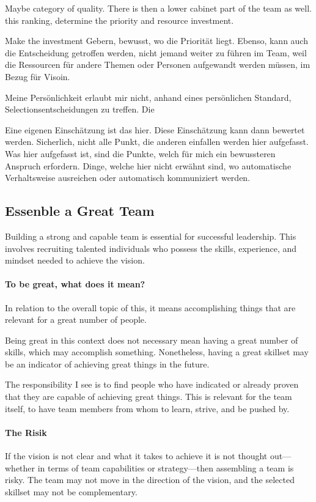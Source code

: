 Maybe category of quality.
There is then a lower cabinet part of the team as well. 
this ranking, determine the priority and resource investment.

Make the investment Gebern, bewusst, wo die Priorität liegt.
Ebenso, kann auch die Entscheidung getroffen werden, nicht jemand weiter zu führen im Team, weil die Ressourcen für andere Themen oder Personen aufgewandt werden müssen, im Bezug für Visoin.

Meine Persönlichkeit erlaubt mir nicht, anhand eines persönlichen Standard, Selectionsentscheidungen zu treffen.
Die 

Eine eigenen Einschätzung ist das hier.
Diese Einschätzung kann dann bewertet werden.
Sicherlich, nicht alle Punkt, die anderen einfallen werden hier aufgefasst. 
Was hier aufgefasst ist, sind die Punkte, welch für mich ein bewussteren Anspruch erfordern. Dinge, welche hier nicht erwähnt sind, wo automatische Verhaltsweise ausreichen oder automatisch kommuniziert werden.


\subsection{Essenble a Great Team}
Building a strong and capable team is essential for successful leadership. This involves recruiting talented individuals who possess the skills, experience, and mindset needed to achieve the vision.


\paragraph{To be great, what does it mean?}
In relation to the overall topic of this, it means accomplishing things that are relevant for a great number of people.

Being great in this context does not necessary mean having a great number of skills, which may accomplish something. Nonetheless, having a great skillset may be an indicator of achieving great things in the future.

The responsibility I see is to find people who have indicated or already proven that they are capable of achieving great things. This is relevant for the team itself, to have team members from whom to learn, strive, and be pushed by.


\paragraph{The Risik}
If the vision is not clear and what it takes to achieve it is not thought out—whether in terms of team capabilities or strategy—then assembling a team is risky. The team may not move in the direction of the vision, and the selected skillset may not be complementary.



